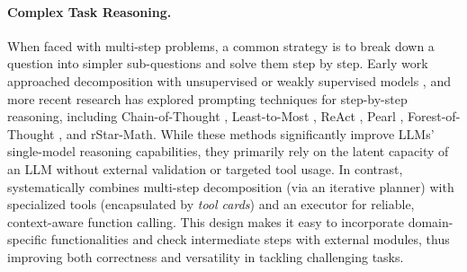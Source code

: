 \paragraph{Complex Task Reasoning.}
When faced with multi-step problems, a common strategy is to break down a question into simpler sub-questions and solve them step by step. Early work approached decomposition with unsupervised or weakly supervised models \citep{perez2020unsupervised, khot2022decomposed}, and more recent research has explored prompting techniques for step-by-step reasoning, including Chain-of-Thought \citep{wei2022chain}, Least-to-Most \citep{zhou2022least}, ReAct \citep{yao2022react}, Pearl \citep{sun2023pearl}, Forest-of-Thought \citep{bi2024forest}, and rStar-Math\citep{guan2025rstar}. While these methods significantly improve LLMs’ single-model reasoning capabilities, they primarily rely on the latent capacity of an LLM without external validation or targeted tool usage. In contrast, \model systematically combines multi-step decomposition (via an iterative planner) with specialized tools (encapsulated by \emph{tool cards}) and an executor for reliable, context-aware function calling. This design makes it easy to incorporate domain-specific functionalities and check intermediate steps with external modules, thus improving both correctness and versatility in tackling challenging tasks.